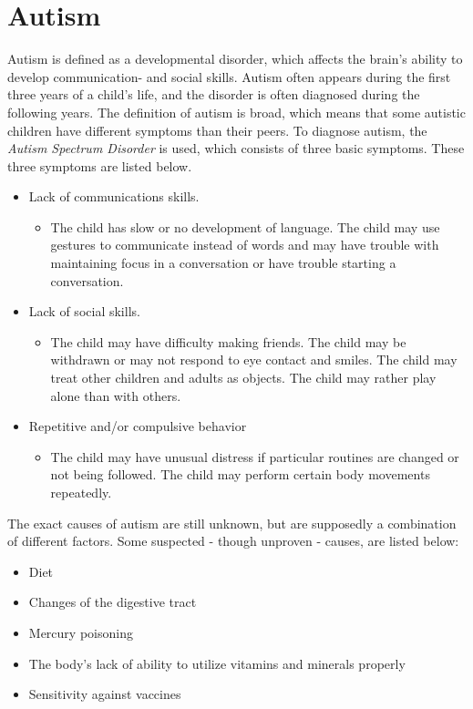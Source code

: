 \section{Autism}
Autism is defined as a developmental disorder, which affects the brain's ability to develop communication- and social skills. Autism often appears during the first three years of a child's life, and the disorder is often diagnosed during the following years. The definition of autism is broad, which means that some autistic children have different symptoms than their peers. To diagnose autism, the \emph{Autism Spectrum Disorder} is used, which consists of three basic symptoms. These three symptoms are listed below.
\begin{itemize}

  \item{Lack of communications skills.}
   \begin{itemize}
     \item{The child has slow or no development of language. The child may use gestures to communicate instead of words and may have trouble with maintaining focus in a conversation or have trouble starting a conversation.}
   \end{itemize}
   
  \item{Lack of social skills.}
   \begin{itemize}
     \item{The child may have difficulty making friends. The child may be withdrawn or may not respond to eye contact and smiles. The child may treat other children and adults as objects. The child may rather play alone than with others.}
   \end{itemize}

  \item{Repetitive and/or compulsive behavior}
    \begin{itemize}
      \item{The child may have unusual distress if particular routines are changed or not being followed. The child may perform certain body movements repeatedly. \cite{autism}}
    \end{itemize}
  
\end{itemize}

The exact causes of autism are still unknown, but are supposedly a combination of different factors. Some suspected - though unproven - causes, are listed below:

\begin{itemize}
  
  \item{Diet}
  \item{Changes of the digestive tract}
  \item{Mercury poisoning}
  \item{The body's lack of ability to utilize vitamins and minerals properly}
  \item{Sensitivity against vaccines\cite{autism}}
  
\end{itemize}

